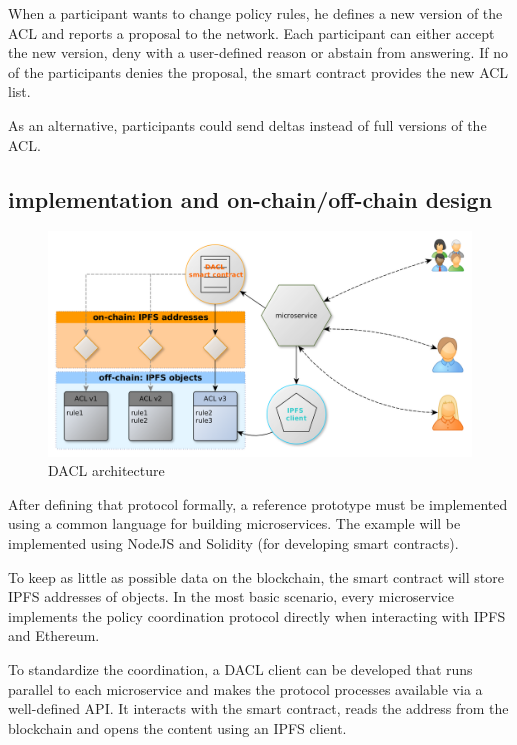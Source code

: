 \documentclass[12pt, conference]{IEEEtran}
\begin{document}
When a participant wants to change policy rules, he defines a new version of the ACL and reports a proposal to the network. Each participant can either accept the new version, deny with a user-defined reason or abstain from answering. If no of the participants denies the proposal, the smart contract provides the new ACL list. 

As an alternative, participants could send deltas instead of full versions of the ACL.\\


\subsection{implementation and on-chain/off-chain design}

\begin{figure}[!h]
  \centering
  \includegraphics[width=\linewidth]{figures/eth-ipfs-design-without-client.png}
  \caption{DACL architecture}
  \label{fig:ipfs-design-without-client}
  \centering
\end{figure}

After defining that protocol formally, a reference prototype must be implemented using a common language for building microservices. The example will be implemented using NodeJS and Solidity (for developing smart contracts). 

To keep as little as possible data on the blockchain, the smart contract will store IPFS addresses of objects. In the most basic scenario, every microservice implements the policy coordination protocol directly when interacting with IPFS and Ethereum. 

To standardize the coordination, a DACL client can be developed that runs parallel to each microservice and makes the protocol processes available via a well-defined API. It interacts with the smart contract, reads the address from the blockchain and opens the content using an IPFS client.
\end{document}
